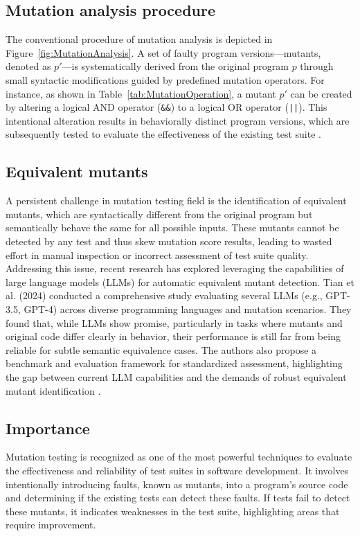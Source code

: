 \subsection{Mutation analysis procedure}

The conventional procedure of mutation analysis is depicted in Figure~\ref{fig:MutationAnalysis}. A set of faulty program versions—mutants, denoted as \( p' \)—is systematically derived from the original program \( p \) through small syntactic modifications guided by predefined mutation operators. For instance, as shown in Table~\ref{tab:MutationOperation}, a mutant \( p' \) can be created by altering a logical AND operator (\texttt{\&\&}) to a logical OR operator (\texttt{||}). This intentional alteration results in behaviorally distinct program versions, which are subsequently tested to evaluate the effectiveness of the existing test suite \cite{jia2011analysis}.

\subsection{Equivalent mutants}

A persistent challenge in mutation testing field is the identification of equivalent mutants, which are syntactically different from the original program but semantically behave the same for all possible inputs. These mutants cannot be detected by any test and thus skew mutation score results, leading to wasted effort in manual inspection or incorrect assessment of test suite quality. Addressing this issue, recent research has explored leveraging the capabilities of large language models (LLMs) for automatic equivalent mutant detection. Tian et al. (2024) conducted a comprehensive study evaluating several LLMs (e.g., GPT-3.5, GPT-4) across diverse programming languages and mutation scenarios. They found that, while LLMs show promise, particularly in tasks where mutants and original code differ clearly in behavior, their performance is still far from being reliable for subtle semantic equivalence cases. The authors also propose a benchmark and evaluation framework for standardized assessment, highlighting the gap between current LLM capabilities and the demands of robust equivalent mutant identification \cite{tian2024large}.

\subsection{Importance}

Mutation testing is recognized as one of the most powerful techniques to evaluate the effectiveness and reliability of test suites in software development. It involves intentionally introducing faults, known as mutants, into a program's source code and determining if the existing tests can detect these faults. If tests fail to detect these mutants, it indicates weaknesses in the test suite, highlighting areas that require improvement.

